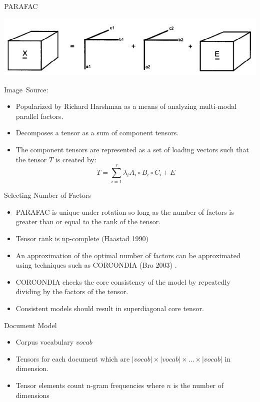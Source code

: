 \documentclass{beamer}
\newcommand{\imagesource}[1]{{\centering\hfill\break\hbox{\scriptsize Image Source:\thinspace{\small\itshape #1}}\par}}
\begin{document}
\begin{frame}{PARAFAC}
    \begin{center}
    \includegraphics[height=0.20\textheight]{images/parafac}
    \imagesource{Rasmus Bro 1997~\cite{bro1997}}
    \end{center}
    \begin{itemize}[<+->]
        \item Popularized by Richard Harshman \cite{harshman1970} as a means of analyzing multi-modal parallel factors.
        \item Decomposes a tensor as a sum of component tensors.
        \item The component tensors are represented as a set of loading vectors such that the tensor $T$ is created by:
        \[
    T = \displaystyle\sum_{i=1}^{r} \lambda_i A_i \circ B_i \circ C_i + E
        \]
    \end{itemize}
\end{frame}

\begin{frame}{Selecting Number of Factors}
    \begin{itemize}[<+->]
        \item PARAFAC is unique under rotation so long as the number of factors is greater than or equal to the rank of the tensor.
        \item Tensor rank is np-complete (Haastad 1990)\cite{haastad1990}
        \item An approximation of the optimal number of factors can be approximated using techniques such as CORCONDIA (Bro 2003) \cite{bro2003}.
        \item CORCONDIA checks the core consistency of the model by repeatedly dividing by the factors of the tensor.
        \item Consistent models should result in superdiagonal core tensor.
    \end{itemize}
\end{frame}

\begin{frame}{Document Model}
    \begin{itemize}[<+->]
        \item Corpus vocabulary $vocab$
        \item Tensors for each document which are $|vocab| \times |vocab| \times \ldots \times |vocab|$ in dimension.
        \item Tensor elements count n-gram frequencies where $n$ is the number of dimensions
    \end{itemize}
\end{frame}
\end{document}
